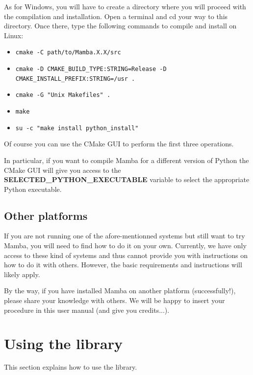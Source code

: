 \documentclass[a4paper,10pt,oneside]{article}
\begin{document}
As for Windows, you will have to create a directory where you will proceed with
the compilation and installation. Open a terminal and cd your way to this 
directory. Once there, type the following commands to compile and install on Linux:

\begin{itemize}
\item \texttt{cmake -C path/to/Mamba.X.X/src}\\
\item \texttt{cmake -D CMAKE\_BUILD\_TYPE:STRING=Release -D CMAKE\_INSTALL\_PREFIX:STRING=/usr .}\\
\item \texttt{cmake -G "Unix Makefiles" .}\\
\item \texttt{make}\\
\item \texttt{su -c "make install python\_install"}
\end{itemize}

Of course you can use the CMake GUI to perform the first three operations.

In particular, if you want to compile Mamba for a different version of Python
the CMake GUI will give you access to the \textbf{SELECTED\_PYTHON\_EXECUTABLE}
variable to select the appropriate Python executable.

\subsection{Other platforms}

If you are not running one of the afore-mentionned systems but still want to try
Mamba, you will need to find how to do it on your own. Currently, we have only access to
these kind of systems and thus cannot provide you with instructions on how to do
it with others. However, the basic requirements and instructions will likely apply.

By the way, if you have installed Mamba on another platform (successfully!), please
share your knowledge with others. We will be happy to insert your procedure in this
user manual (and give you credits...).

\pagebreak

\section{Using the library}
\label{cha:using_library}

This section explains how to use the library.
\end{document}
